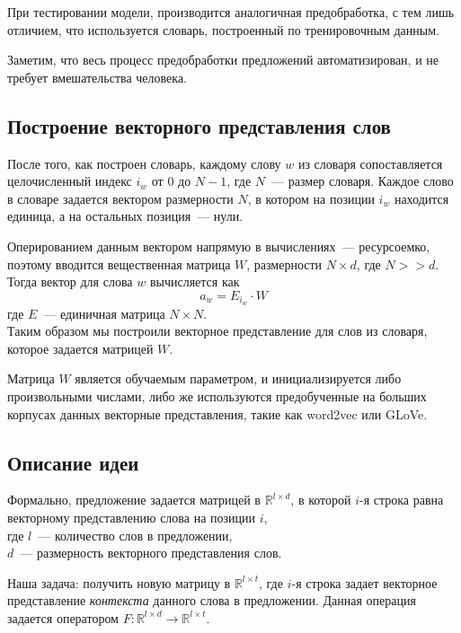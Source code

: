При тестировании модели, производится аналогичная предобработка, 
с тем лишь отличием, что используется словарь, построенный по тренировочным данным.

Заметим, что весь процесс предобработки предложений автоматизирован, 
и не требует вмешательства человека.

\subsection{Построение векторного представления слов} \label{word_embedding}
После того, как построен словарь, каждому слову $w$ из словаря сопоставляется целочисленный индекс $i_w$ 
от $0$ до $N-1$, где $N$~--- размер словаря.
Каждое слово в словаре задается вектором размерности $N$, 
в котором на позиции $i_w$ находится единица, а на остальных позиция~--- нули.

Оперированием данным вектором напрямую в вычислениях~--- ресурсоемко, поэтому вводится вещественная матрица $W$, размерности $N \times d$, где $N >> d$.\\
Тогда вектор для слова $w$ вычисляется как
$$a_w = E_{i_w} \cdot W$$
где $E$~--- единичная матрица $N \times N$.\\
Таким образом мы построили векторное представление для слов из словаря, которое задается матрицей $W$.

Матрица $W$ является обучаемым параметром, и инициализируется либо произвольными числами, 
либо же используются предобученные на больших корпусах данных векторные представления, 
такие как word2vec или GLoVe\cite{wor2vec, glove}.

\subsection{Описание идеи } \label{loc_context}

Формально, предложение задается матрицей в  $\mathbb{R}^{l \times{} d}$, в которой $i$-я строка равна векторному представлению слова на позиции $i$,\\
где $l$~--- количество слов в предложении,\\
$d$~--- размерность векторного представления слов. 

Наша задача: получить новую матрицу в $\mathbb{R}^{l \times {} t}$, где $i$-я строка задает векторное представление \textit{контекста} данного слова в предложении. 
Данная операция задается оператором $F:\mathbb{R}^{l \times d} \to \mathbb{R}^{l \times t}$.

